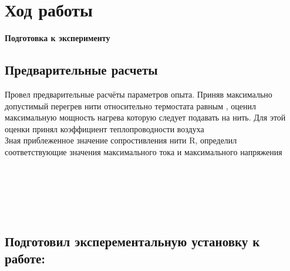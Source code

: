 
\section{\Large Ход работы}

\begin{center}
    {\Large\bf Подготовка к эксперименту}
\end{center}

\subsection{Предварительные расчеты}
\hspace{1cm}Провел предварительные расчёты параметров опыта. Приняв максимально допустимый перегрев нити относительно термостата равным , оценил максимальную мощность нагрева  которую следует подавать на нить. Для этой оценки принял коэффициент теплопроводности воздуха  \\

\noindent\hspace{1cm}Зная приблеженное значение сопростивления нити R, определил  соответствующие значения максимального тока  и максимального напряжения  \\

\noindent\hspace{1cm}{\bfПолученные значения:} \\[0.2cm]

\noindent{}\\

\noindent{}\\

\noindent{}\\

\noindent{}\\

\subsection{Подготовил эксперементальную установку к работе:}

